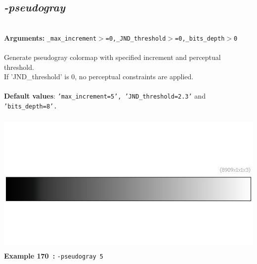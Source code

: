 \documentclass[a4paper,11pt,twoside]{book}
\begin{document}
\subsection{\emph{-pseudogray} }\vspace*{-0.5em}
~\\\textbf{Arguments: } 
{\small \texttt{\_max\_increment$>$=0,\_JND\_threshold$>$=0,\_bits\_depth$>$0}}\\~\\
Generate pseudogray colormap with specified increment and perceptual threshold.
~\\If 'JND\_threshold' is 0, no perceptual constraints are applied.
~\\~\\\textbf{Default values}: {\small \texttt{'max\_increment=5', 'JND\_threshold=2.3'} and \texttt{'bits\_depth=8'.}}
\begin{center}\includegraphics[keepaspectratio=true,height=7cm,width=\textwidth]{img/gmic_def170.jpg}\\
{\footnotesize \textbf{Example 170~:} \texttt{-pseudogray 5}}
\end{center}
\end{document}
